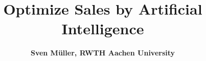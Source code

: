\newenvironment{defsymbols}[1]
  {\begin{list}{}{\settowidth{\labelwidth}{#1}
  \setlength{\leftmargin}{\labelwidth}
  \addtolength{\leftmargin}{\labelsep}
  \parsep 0.5ex plus 0.2ex minus 0.2ex \itemsep 0.3ex %
  \renewcommand{\makelabel}[1]{ ##1 \hfill}}}{\end{list}\vspace*{0.25cm}}

\setcounter{stepnr}{1}
\def\step{{\em step} & {\em\thestepnr:} \stepcounter{stepnr}}




\documentclass[xcolor=dvipsnames,aspectratio=169,handout]{beamer}
\usepackage{mathtools}
\usepackage[mode=buildnew]{standalone}


\newcommand{\prof}{Sven Müller, RWTH Aachen University}
\newcommand{\course}{Optimize Sales by Artificial Intelligence}






\title[DCA]{{\sffamily \textbf{\LARGE \course \\  [1.5ex] }}}
\author[Müller]{\textbf{{\sffamily \prof }}}


\titlegraphic{
}

\begin{frame}[plain]
\titlepage
\end{frame}

